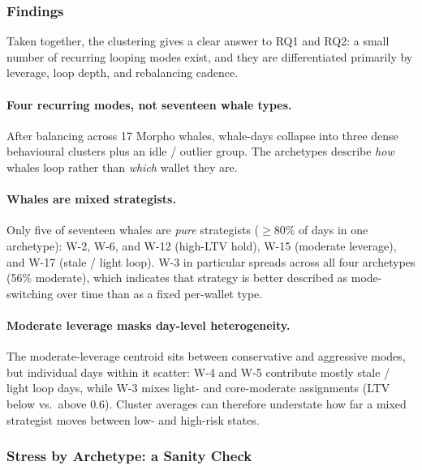 \subsubsection{Findings}
\label{sec:arch-findings}

Taken together, the clustering gives a clear answer to RQ1 and RQ2: a
small number of recurring looping modes exist, and they are differentiated
primarily by leverage, loop depth, and rebalancing cadence.

\paragraph{Four recurring modes, not seventeen whale types.}
After balancing across 17 Morpho whales, whale-days collapse into three
dense behavioural clusters plus an idle / outlier group. The archetypes
describe \emph{how} whales loop rather than \emph{which} wallet they are.

\paragraph{Whales are mixed strategists.}
Only five of seventeen whales are \emph{pure} strategists ($\geq 80\%$ of
days in one archetype): W-2, W-6, and W-12 (high-LTV hold), W-15
(moderate leverage), and W-17 (stale / light loop). W-3 in particular
spreads across all four archetypes (56\% moderate), which indicates that
strategy is better described as mode-switching over time than as a fixed
per-wallet type.

\paragraph{Moderate leverage masks day-level heterogeneity.}
The moderate-leverage centroid sits between conservative and aggressive
modes, but individual days within it scatter: W-4 and W-5 contribute
mostly stale / light loop days, while W-3 mixes light- and core-moderate
assignments (LTV below vs.\ above $0.6$). Cluster averages can therefore
understate how far a mixed strategist moves between low- and high-risk
states.

\subsubsection{Stress by Archetype: a Sanity Check}
\label{sec:stress-by-archetype}

